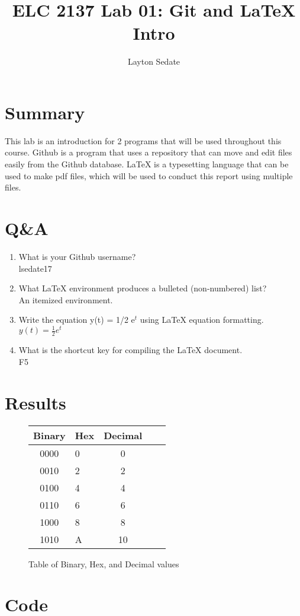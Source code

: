\documentclass[11pt]{article}
\newcommand{\Verilog}[2][]{%
	
}
\begin{document}
\title{ELC 2137 Lab 01: Git and LaTeX Intro}
\author{Layton Sedate}

\maketitle


\section*{Summary}

This lab is an introduction for 2 programs that will be used throughout this course. Github is a program that uses a repository that can move and edit files easily from the Github database. LaTeX is a typesetting language that can be used to make pdf files, which will be used to conduct this report using multiple files.


\section*{Q\&A}

\begin{enumerate}
	\item What is your Github username?
	\\lsedate17
	\item What LaTeX environment produces a bulleted (non-numbered) list?
	\\An itemized environment.
	\item Write the equation y(t) = 1/2 e$^t$ using LaTeX equation formatting.
	\\$y(t) = \frac{1}{2}e^t$
	\item What is the shortcut key for compiling the LaTeX document.
	\\F5
\end{enumerate}


\section*{Results}

\begin{figure}[ht]
	\begin{center}
		\begin{tabular}{clclc}
			Binary & Hex & Decimal\\
			\toprule
			0000 & 0 & 0\\
			0010 & 2 & 2\\
			0100 & 4 & 4\\
			0110 & 6 & 6\\
			1000 & 8 & 8\\
			1010 & A & 10\\
			\bottomrule
		\end{tabular}
		\caption{Table of Binary, Hex, and Decimal values}
	\end{center}
\end{figure}
\newpage
\section*{Code}

\Verilog[caption=File-include Verilog code example,label = code:file_ex]{lab1_example_code.sv}
\end{document}
